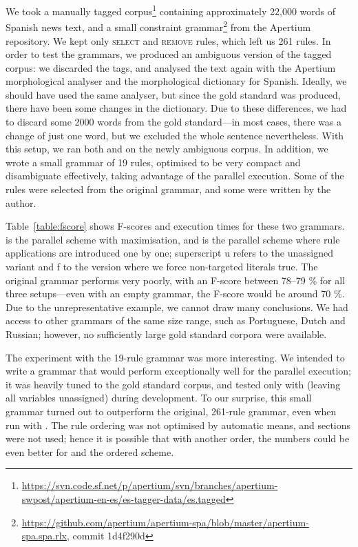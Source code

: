 We took a manually tagged
corpus\footnote{\url{https://svn.code.sf.net/p/apertium/svn/branches/apertium-swpost/apertium-en-es/es-tagger-data/es.tagged}}
containing approximately 22,000 words of Spanish news text, and a
small constraint
grammar\footnote{\url{https://github.com/apertium/apertium-spa/blob/master/apertium-spa.spa.rlx}, commit 1d4f290d} from the Apertium repository.  We kept only
\textsc{select} and \textsc{remove} rules, which left us 261 rules.
In order to test the grammars, we produced an ambiguous version of the
tagged corpus: we discarded the tags, and analysed the text again with
the Apertium morphological analyser and the morphological dictionary
for Spanish. Ideally, we should have used the same analyser, but since
the gold standard was produced, there have been some changes in the
dictionary. Due to these differences, we had to discard some 2000
words from the gold standard---in most cases, there was a change of
just one word, but we excluded the whole sentence nevertheless.  With
this setup, we ran both \satcg{} and  on the newly ambiguous
corpus.  In addition, we wrote a small grammar of 19 rules, optimised
to be very compact and disambiguate effectively, taking advantage of
the parallel execution.  Some of the rules were selected from the
original grammar, and some were written by the author.


Table~\ref{table:fscore} shows F-scores and execution times for these two grammars. 
\satcgMax{} is the parallel scheme with maximisation, and
\satcgOrd{} is the parallel scheme where rule applications are introduced one by one; superscript {\sc u} refers to the unassigned variant and {\sc f} to the version where we force non-targeted literals true.
The original grammar performs very poorly, with an F-score between 78--79 \% for all three setups---even with an empty grammar, the F-score would be around 70 \%. 
Due to the unrepresentative example, we cannot draw many conclusions. 
We had access to other grammars of the same size range, such as 
Portuguese, Dutch and Russian; 
however, no sufficiently large gold standard corpora were available.

The experiment with the 19-rule grammar was more interesting.
We intended to write a grammar that would perform exceptionally well for the parallel 
execution; it was heavily tuned to the gold standard corpus, 
and tested only with \satcg{} (leaving all variables unassigned) during development.
To our surprise, this small grammar turned out to outperform the original, 
261-rule grammar, even when run with . 
The rule ordering was not optimised by automatic means, and sections were not used; hence it is possible that with another order, the numbers could be even better for  and the ordered scheme. 


